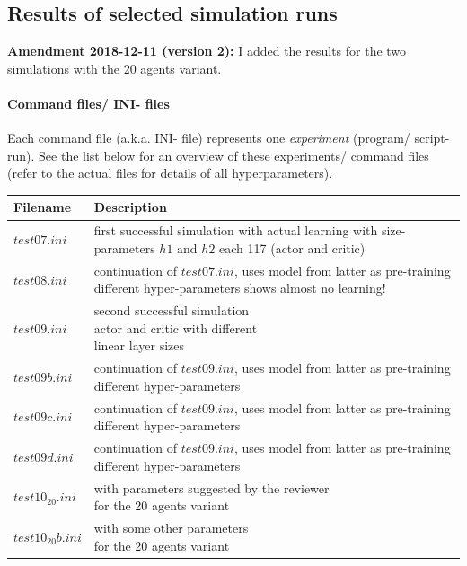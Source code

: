 \documentclass[a4paper]{article}
\begin{document}
\subsection{Results of selected simulation runs}

\textbf{Amendment 2018-12-11 (version 2):} I added the results for the two
simulations with the 20 agents variant.

\paragraph{Command files/ INI- files}
Each command file (a.k.a. INI- file) represents one \textit{experiment} (program/ script- run).
See the list below for an overview of these experiments/ command files
(refer to the actual files for details of all hyperparameters).
\\

\begin{tabular}{ |l|l| }
  \hline
Filename & Description \\
  \hline
$test07.ini$ & \makecell[tl]{first successful simulation with actual learning \\ with size- parameters $h1$ and $h2$ each 117 \\ (actor and critic)} \\
$test08.ini$ & \makecell[tl]{continuation of $test07.ini$, uses model \\ from latter as pre-training \\ different hyper-parameters \\ shows almost no learning!} \\
$test09.ini$ & \makecell[tl]{second successful simulation \\ actor and critic with different \\ linear layer sizes } \\
$test09b.ini$ & \makecell[tl]{continuation of $test09.ini$, uses model \\ from latter as pre-training \\ different hyper-parameters} \\
$test09c.ini$ & \makecell[tl]{continuation of $test09.ini$, uses model \\ from latter as pre-training \\ different hyper-parameters} \\
$test09d.ini$ & \makecell[tl]{continuation of $test09.ini$, uses model \\ from latter as pre-training \\ different hyper-parameters} \\
  \hline
$test10_20.ini$ & \makecell[tl]{with parameters suggested by the reviewer \\ for the 20 agents variant} \\
$test10_20b.ini$ & \makecell[tl]{with some other parameters \\ for the 20 agents variant} \\
  \hline
\end{tabular}
\end{document}
